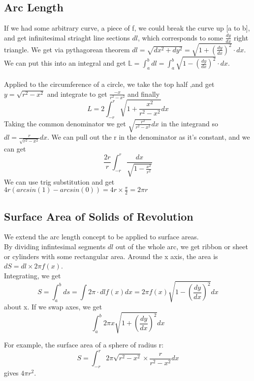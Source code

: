 \documentclass[twocolumn, 12pt]{report}
\begin{document}
\subsection{Arc Length}
If we had some arbitrary curve, a piece of f, we could break the curve up [a to b], and get infinitesimal striaght line sections $dl$, which corresponds to some $\frac{dy}{dx}$ right triangle. We get via pythagorean theorem $dl = \sqrt{dx^2 + dy^2} = \sqrt{1 + (\frac{dy}{dx})^2} \cdot dx$. We can put this into an integral and get $\mathbb{L} = \int_a^b dl = \int_a^b \sqrt {1-(\frac{dy}{dx})^2} \cdot dx $. \\\\
Applied to the circumference of a circle, we take the top half ,and get $y = \sqrt{r^2 - x^2}$ and integrate to get $\frac{-x}{r^2 - x^2}$ and finally $$L  = 2 \int_{-r}^r \sqrt{1 + \frac{x^2}{r^2-x^2}} dx$$ Taking the common denominator we get $\sqrt{\frac{r^2}{r^2 - x^2}}dx$ in the integrand so $dl = \frac{r}{\sqrt{r^2 - x^2}}dx$. We can pull out the r in the denominator as it's constant, and we can get $$\frac{2r}{r}\int_{-r}^r \frac{dx}{\sqrt{1-\frac{x^2}{r^2}}} $$
We can use trig substitution and get $4r (arcsin(1)- arcsin(0)) = 4r \times \frac{\pi}{2}=2\pi r$
\subsection{Surface Area of Solids of Revolution}
We extend the arc length concept to be applied to surface areas. \\ By dividing infintesimal segments $dl$ out of the whole arc, we get ribbon or sheet or cylinders with some rectangular area. Around the x axis, the area is $dS = dl \times 2\pi f(x)$. \\ Integrating, we get $$S = \int_a^b ds = \int 2\pi\cdot dl f(x)dx = 2\pi f(x) \sqrt{1-(\frac{dy}{dx})^2}dx$$ about x. If we swap axes, we get $$\int_a^b 2\pi x\sqrt{1+(\frac{dy}{dx})^2} dx $$

For example, the surface area of a sphere of radius r:\\
$$S = \int_{-r}^r 2\pi \sqrt{r^2 - x^2} \times \frac{r}{r^2-x^2}dx$$ gives $4\pi r^2$.
\end{document}
